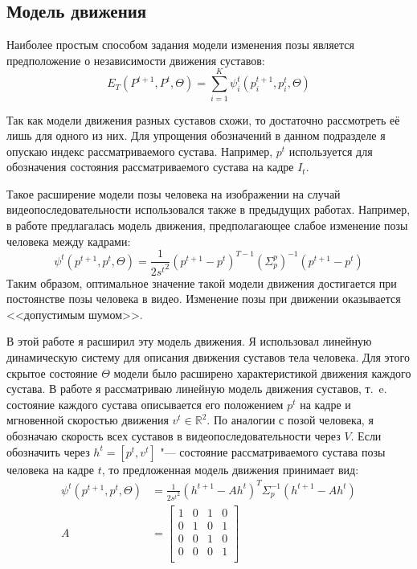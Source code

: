 \subsection{Модель движения}

Наиболее простым способом задания модели изменения позы является предположение о независимости движения суставов:
\begin{equation}
	E_T(P^{t+1}, P^{t}, \Theta) = \sum_{i=1}^K\psi_i^t(p_i^{t+1}, p_i^t, \Theta)
\end{equation}

Так как модели движения разных суставов схожи, то достаточно рассмотреть её лишь для одного из них. Для упрощения обозначений в данном подразделе я опускаю индекс рассматриваемого сустава. Например, $p^t$ используется для обозначения состояния рассматриваемого сустава на кадре $I_t$.

Такое расширение модели позы человека на изображении на случай видеопоследовательности использовался также в предыдущих работах. Например, в работе \cite{park2011n} предлагалась модель движения, предполагающее слабое изменение позы человека между кадрами:
\begin{equation*}
	\psi^t(p^{t+1}, p^t, \Theta) = \frac{1} {2 {s^t}^2}(p^{t+1} - p^t)^{T-1} \left(\Sigma_p^p\right)^{-1} (p^{t+1} - p^t)
\end{equation*}
Таким образом, оптимальное значение такой модели движения достигается при постоянстве позы человека в видео. Изменение позы при движении оказывается <<допустимым шумом>>.

В этой работе я расширил эту модель движения. Я использовал линейную динамическую систему для описания движения суставов тела человека. Для этого скрытое состояние $\Theta$ модели было расширено характеристикой движения каждого сустава. В работе я рассматриваю линейную модель движения суставов, т.~e. состояние каждого сустава описывается его положением $p^t$ на кадре и мгновенной скоростью движения $v^t \in \mathbb{R}^2$. По аналогии с позой человека, я обозначаю скорость всех суставов в видеопоследовательности через $V$. Если обозначить через $h^t = [p^t, v^t]$ "--- состояние рассматриваемого сустава позы человека на кадре $t$, то предложенная модель движения принимает вид:
\begin{equation}
	\begin{aligned}
		\psi^t(p^{t+1}, p^{t}, \Theta) &=
			\frac{1}{2 {s^t}^2} (h^{t+1} - A h^t)^T \Sigma_p^{-1} (h^{t+1} - A h^t) \\
		A &=
			\begin{bmatrix}
			1 & 0 & 1 & 0 \\
			0 & 1 & 0 & 1 \\
			0 & 0 & 1 & 0 \\
			0 & 0 & 0 & 1 \\
			\end{bmatrix} \\
	\label{eq::temp}
	\end{aligned}
\end{equation}

